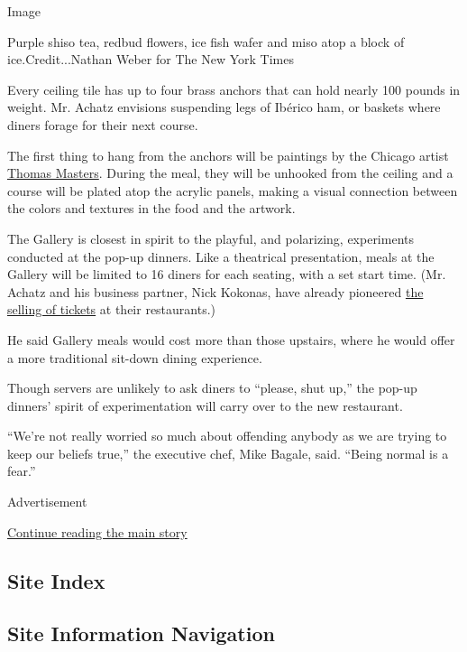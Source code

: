 Image

Purple shiso tea, redbud flowers, ice fish wafer and miso atop a block
of ice.Credit...Nathan Weber for The New York Times

Every ceiling tile has up to four brass anchors that can hold nearly 100
pounds in weight. Mr. Achatz envisions suspending legs of Ibérico ham,
or baskets where diners forage for their next course.

The first thing to hang from the anchors will be paintings by the
Chicago artist
\href{http://www.thomasmastersgallery.com/artist_view/?id=28}{Thomas
Masters}. During the meal, they will be unhooked from the ceiling and a
course will be plated atop the acrylic panels, making a visual
connection between the colors and textures in the food and the artwork.

The Gallery is closest in spirit to the playful, and polarizing,
experiments conducted at the pop-up dinners. Like a theatrical
presentation, meals at the Gallery will be limited to 16 diners for each
seating, with a set start time. (Mr. Achatz and his business partner,
Nick Kokonas, have already pioneered
\href{http://www.nytimes3xbfgragh.onion/2010/05/05/dining/05achatz.html}{the
selling of tickets} at their restaurants.)

He said Gallery meals would cost more than those upstairs, where he
would offer a more traditional sit-down dining experience.

Though servers are unlikely to ask diners to ``please, shut up,'' the
pop-up dinners' spirit of experimentation will carry over to the new
restaurant.

``We're not really worried so much about offending anybody as we are
trying to keep our beliefs true,'' the executive chef, Mike Bagale,
said. ``Being normal is a fear.''

Advertisement

\protect\hyperlink{after-bottom}{Continue reading the main story}

\hypertarget{site-index}{%
\subsection{Site Index}\label{site-index}}

\hypertarget{site-information-navigation}{%
\subsection{Site Information
Navigation}\label{site-information-navigation}}

